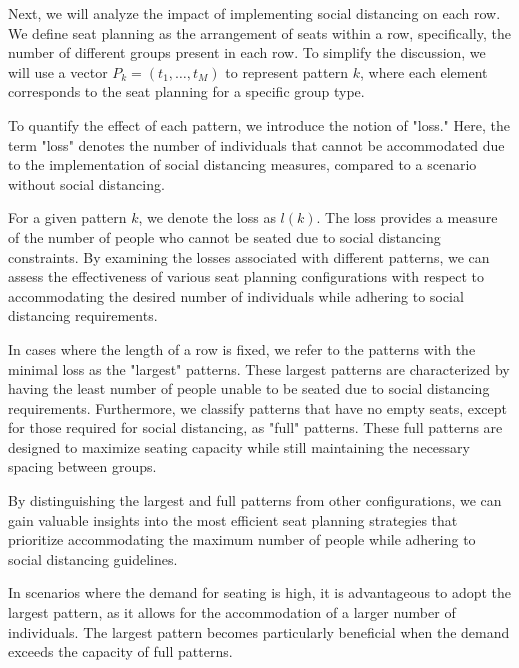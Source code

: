 

Next, we will analyze the impact of implementing social distancing on each row. We define seat planning as the arrangement of seats within a row, specifically, the number of different groups present in each row. To simplify the discussion, we will use a vector $P_k = (t_1, \ldots, t_M)$ to represent pattern $k$, where each element corresponds to the seat planning for a specific group type.

To quantify the effect of each pattern, we introduce the notion of "loss." Here, the term "loss" denotes the number of individuals that cannot be accommodated due to the implementation of social distancing measures, compared to a scenario without social distancing.

For a given pattern $k$, we denote the loss as $l(k)$. The loss provides a measure of the number of people who cannot be seated due to social distancing constraints. By examining the losses associated with different patterns, we can assess the effectiveness of various seat planning configurations with respect to accommodating the desired number of individuals while adhering to social distancing requirements. 

In cases where the length of a row is fixed, we refer to the patterns with the minimal loss as the "largest" patterns. These largest patterns are characterized by having the least number of people unable to be seated due to social distancing requirements. Furthermore, we classify patterns that have no empty seats, except for those required for social distancing, as "full" patterns. These full patterns are designed to maximize seating capacity while still maintaining the necessary spacing between groups.

By distinguishing the largest and full patterns from other configurations, we can gain valuable insights into the most efficient seat planning strategies that prioritize accommodating the maximum number of people while adhering to social distancing guidelines.

In scenarios where the demand for seating is high, it is advantageous to adopt the largest pattern, as it allows for the accommodation of a larger number of individuals. The largest pattern becomes particularly beneficial when the demand exceeds the capacity of full patterns.


